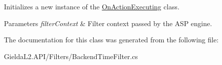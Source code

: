 Initializes a new instance of the \mbox{\hyperlink{class_gielda_l2_1_1_a_p_i_1_1_filters_1_1_backend_time_filter_a574dadcdcdbee12457c072577873497b}{On\+Action\+Executing}} class. 


\begin{DoxyParams}{Parameters}
{\em filter\+Context} & Filter context passed by the A\+SP engine.\\
\hline
\end{DoxyParams}


The documentation for this class was generated from the following file\+:\begin{DoxyCompactItemize}
\item 
Gielda\+L2.\+A\+P\+I/\+Filters/Backend\+Time\+Filter.\+cs\end{DoxyCompactItemize}
